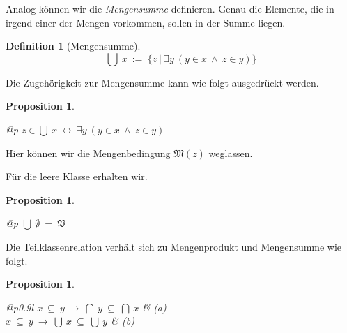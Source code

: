 \documentclass[a4paper,german,10pt,twoside]{book}
\newtheorem{prop}[thm]{Proposition}
\theoremstyle{definition}
\newtheorem{defn}[thm]{Definition}
\theoremstyle{remark}
\begin{document}
\par
Analog k{\"o}nnen wir die \emph{Mengensumme} definieren.
Genau die Elemente, die in irgend einer der Mengen vorkommen, sollen in der Summe liegen.

\begin{defn}[Mengensumme]
\label{definition:setSum} \hypertarget{definition:setSum}{}
$$\bigcup \ x\ := \ \{ z \ | \ \exists y\ (y \in x\ \land \ z \in y) \} $$

\end{defn}




\par
Die Zugeh{\"o}rigkeit zur Mengensumme kann wie folgt ausgedr{\"u}ckt werden.

\begin{prop}
\label{theorem:setSumMembership} \hypertarget{theorem:setSumMembership}{}
\mbox{}
\begin{longtable}{{@{\extracolsep{\fill}}p{\linewidth}}}
\centering $z \in \bigcup \ x\ \leftrightarrow \ \exists y\ (y \in x\ \land \ z \in y)$
\end{longtable}

\end{prop}

Hier k{\"o}nnen wir die Mengenbedingung $\mathfrak{M}(z)$ weglassen.


\par
F{\"u}r die leere Klasse erhalten wir.

\begin{prop}
\label{theorem:emptySetSum} \hypertarget{theorem:emptySetSum}{}
\mbox{}
\begin{longtable}{{@{\extracolsep{\fill}}p{\linewidth}}}
\centering $\bigcup \ \emptyset \ =  \ \mathfrak{V}$
\end{longtable}

\end{prop}




\par
Die Teilklassenrelation verh{\"a}lt sich zu Mengenprodukt und Mengensumme wie folgt.

\begin{prop}
\label{theorem:subsetSumProductImplication} \hypertarget{theorem:subsetSumProductImplication}{}
\mbox{}
\begin{longtable}{{@{\extracolsep{\fill}}p{0.9\linewidth}l}}
\centering $x \ \subseteq \ y\ \rightarrow \ \bigcap \ y \ \subseteq \ \bigcap \ x$ & \label{theorem:subsetSumProductImplication:a} \hypertarget{theorem:subsetSumProductImplication:a}{} \mbox{\emph{(a)}} \\
\centering $x \ \subseteq \ y\ \rightarrow \ \bigcup \ x \ \subseteq \ \bigcup \ y$ & \label{theorem:subsetSumProductImplication:b} \hypertarget{theorem:subsetSumProductImplication:b}{} \mbox{\emph{(b)}} 
\end{longtable}

\end{prop}
\end{document}
